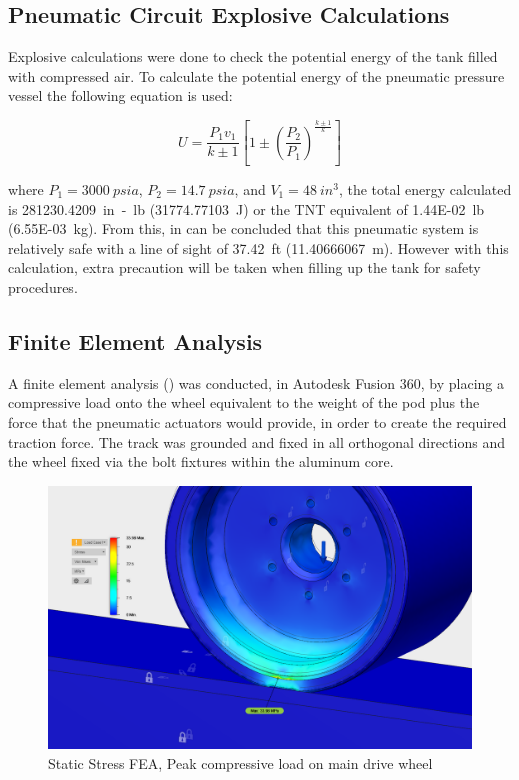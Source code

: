 \documentclass[main.tex]{subfiles}
\begin{document}
     \subsection{Pneumatic Circuit Explosive Calculations}
    Explosive calculations were done to check the potential energy of the tank filled with compressed air. To calculate the potential energy of the pneumatic pressure vessel the following equation is used:\\ 
    \begin{center}
        \[
        U = \frac{P_1 v_1}{k\pm{1}} [1\pm(\frac{P_2}{P_1})^ \frac{k\pm{1}}{k}]
        \]
	\end{center}
	where ${P_1}=\SI{3000}{psia}$, ${P_2}=\SI{14.7}{psia}$, and ${V_1}=\SI{48}{in^3}$, the total energy calculated is \SI{281230.4209}{in-lb} (\SI{31774.77103}{J}) or the  TNT equivalent of \SI{1.44E-02}{lb} (\SI{6.55E-03}{kg}). From this, in can be concluded that this pneumatic system is relatively safe with a line of sight of \SI{37.42}{ft} (\SI{11.40666067}{m}). However with this calculation, extra precaution will be taken when filling up the tank for safety procedures.
   

    \subsection{Finite Element Analysis}
    
    A finite element analysis () was conducted, in Autodesk Fusion 360, by placing a compressive load onto the wheel equivalent to the weight of the pod plus the force that the pneumatic actuators would provide, in order to create the required traction force. The track was grounded and fixed in all orthogonal directions and the wheel fixed via the bolt fixtures within the aluminum core.\\
    
\begin{figure}
        \centering
        \includegraphics[width=\linewidth]{images/fig21}
        \caption{Static Stress FEA, Peak compressive load on main drive wheel}
        \label{fig:drive-wheel-stress}
    \end{figure}
    
\end{document}
